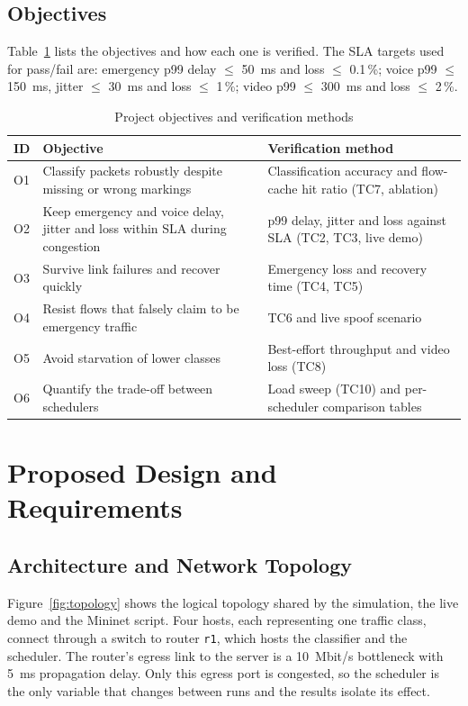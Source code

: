 \documentclass[12pt,a4paper]{article}
\newcommand{\code}[1]{\texttt{#1}}
\begin{document}
\subsection{Objectives}
Table~\ref{tab:objectives} lists the objectives and how each one is verified. The SLA targets used
for pass/fail are: emergency p99 delay $\le$ 50~ms and loss $\le$ 0.1\,\%; voice p99 $\le$ 150~ms,
jitter $\le$ 30~ms and loss $\le$ 1\,\%; video p99 $\le$ 300~ms and loss $\le$ 2\,\%.

\begin{table}[H]\centering\small
\caption{Project objectives and verification methods}\label{tab:objectives}
\begin{tabularx}{\textwidth}{|l|X|X|}\hline
\textbf{ID} & \textbf{Objective} & \textbf{Verification method}\\\hline
O1 & Classify packets robustly despite missing or wrong markings & Classification accuracy and flow-cache hit ratio (TC7, ablation)\\\hline
O2 & Keep emergency and voice delay, jitter and loss within SLA during congestion & p99 delay, jitter and loss against SLA (TC2, TC3, live demo)\\\hline
O3 & Survive link failures and recover quickly & Emergency loss and recovery time (TC4, TC5)\\\hline
O4 & Resist flows that falsely claim to be emergency traffic & TC6 and live spoof scenario\\\hline
O5 & Avoid starvation of lower classes & Best-effort throughput and video loss (TC8)\\\hline
O6 & Quantify the trade-off between schedulers & Load sweep (TC10) and per-scheduler comparison tables\\\hline
\end{tabularx}
\end{table}

\section{Proposed Design and Requirements}

\subsection{Architecture and Network Topology}
Figure~\ref{fig:topology} shows the logical topology shared by the simulation, the live demo and
the Mininet script. Four hosts, each representing one traffic class, connect through a switch to
router \code{r1}, which hosts the classifier and the scheduler. The router's egress link to the
server is a 10~Mbit/s bottleneck with 5~ms propagation delay. Only this egress port is congested,
so the scheduler is the only variable that changes between runs and the results isolate its effect.
\end{document}
